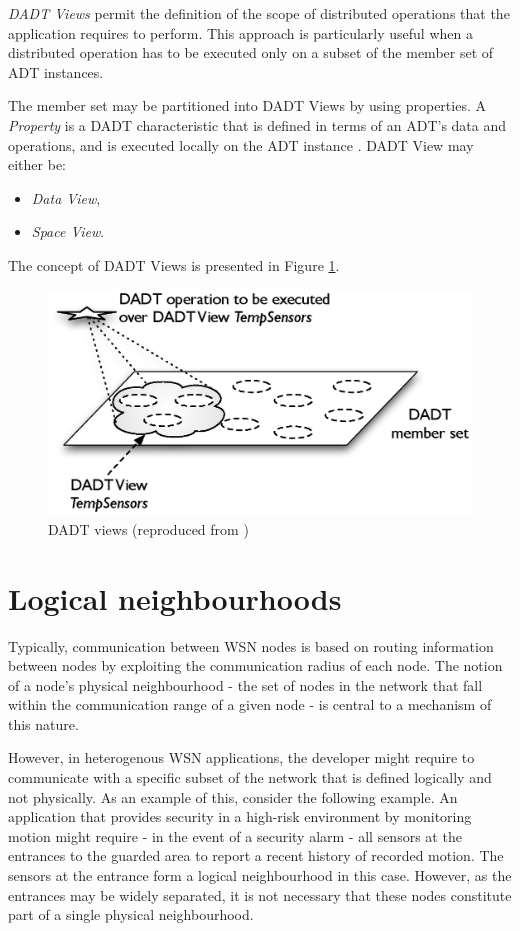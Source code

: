 \emph{DADT Views} permit the definition of the scope of distributed operations
that the application requires to perform. This approach is particularly useful
when a distributed operation has to be executed only on a subset of the
member set of ADT instances.

The member set may be partitioned into DADT Views by using properties. A
\emph{Property} is a DADT characteristic that is defined in terms of an ADT's
data and operations, and is executed locally on the ADT instance
\cite{migliavacca_DADT:2006}.
DADT View may either be:
\begin{itemize}
  \item \emph{Data View},
  \item \emph{Space View}.
\end{itemize}

The concept of DADT Views is presented in Figure \ref{Fig:DADT_Views}.

\begin{figure}
\centering
\includegraphics[scale=0.71]{img/DADT_Views.eps} 
\caption[DADT Views]{DADT views (reproduced from \cite{migliavacca_DADT:2006})}
\label{Fig:DADT_Views}
\end{figure}

\section {Logical neighbourhoods} \label{LNDescription}

Typically, communication between WSN nodes is based on routing 
information between nodes by exploiting the communication radius of each node.
The notion of a node's physical neighbourhood - the set of nodes in the
network that fall within the communication range of a given node - is central to a mechanism of this nature.

However, in heterogenous WSN applications, the developer might require to
communicate with a specific subset of the network that is defined logically and
not physically. As an example of this, consider the following example. An
application that provides security in a high-risk environment by monitoring 
motion might require - in the event of a security alarm - all sensors at the
entrances to the guarded area to report a recent history of recorded motion.
The sensors at the entrance form a logical neighbourhood in this case. However,
as the entrances may be widely separated, it is not necessary that these nodes constitute part of a single physical neighbourhood. 

